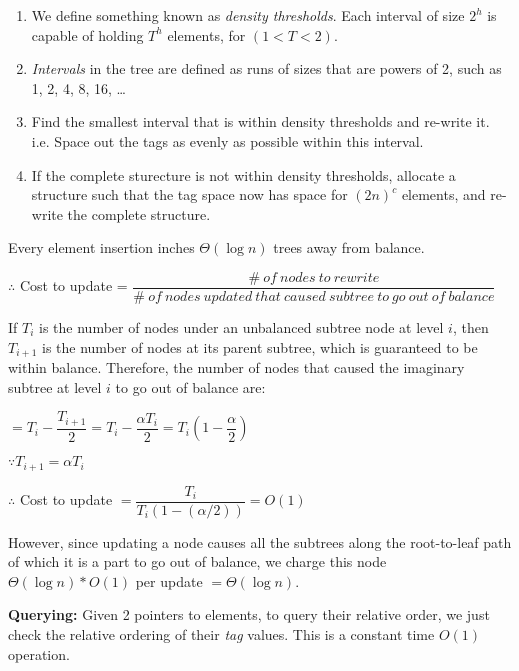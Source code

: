 \documentclass{article}
\begin{document}
\begin{enumerate}

\item We define something known as \textit{density thresholds}. Each
  interval of size $2^h$ is capable of holding $T^h$ elements, for $(1
  < T < 2)$.

\item \textit{Intervals} in the tree are defined as runs of sizes that
  are powers of 2, such as 1, 2, 4, 8, 16, \ldots{}

\item Find the smallest interval that is within density thresholds and
  re-write it. i.e. Space out the tags as evenly as possible within
  this interval.

\item If the complete sturecture is not within density thresholds,
  allocate a structure such that the tag space now has space for
  ${(2n)}^c$ elements, and re-write the complete structure.

\end{enumerate}

Every element insertion inches $\Theta(\log{n})$ trees away from
balance.

$\therefore$ Cost to update =
$\dfrac{\#\ of\ nodes\ to\ rewrite}{\#\ of\ nodes\ updated\ that\ caused\ subtree\ to\ go\ out\ of\ balance}$

If $T_i$ is the number of nodes under an unbalanced subtree node at
level $i$, then $T_{i+1}$ is the number of nodes at its parent
subtree, which is guaranteed to be within balance. Therefore, the
number of nodes that caused the imaginary subtree at level $i$ to go
out of balance are:

$= T_i - \dfrac{T_{i+1}}{2} = T_i - \dfrac{\alpha T_i}{2} =
T_i\left(1-\dfrac{\alpha}{2}\right)$

$\because T_{i+1} = \alpha T_i$

$\therefore$ Cost to update $= \dfrac{T_i}{T_i(1-(\alpha/2))} = O(1)$

However, since updating a node causes all the subtrees along the
root-to-leaf path of which it is a part to go out of balance, we
charge this node $\Theta(\log{n}) * O(1)$ per update
$=\Theta(\log{n})$.

\textbf{Querying:} Given 2 pointers to elements, to query their
relative order, we just check the relative ordering of their
\textit{tag} values. This is a constant time $O(1)$ operation.

\clearpage
\end{document}
